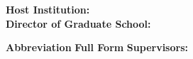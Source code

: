 \begin{titlepage}

  {\large \textbf{Host Institution: \hostInstitution}}\\[0.5cm]
  {\large \textbf{Director of Graduate School: \directorName \underline{\hspace{1.5cm}}}}\\
  \begin{tabbing}
  \textbf{Abbreviation} \hspace{1cm} \= \textbf{Full Form} \kill
  {\large\textbf{Supervisors: }} \>  {\large\textbf{\supervisorName \underline{\hspace{5cm}}}}\\[0.5cm]
  \>  {\large\textbf{\cosupervisorName \underline{\hspace{5cm}}}}\\[0.5cm]
  \end{tabbing}
  \centering
  {\large \submissionDate}

\end{titlepage}

\clearpage
